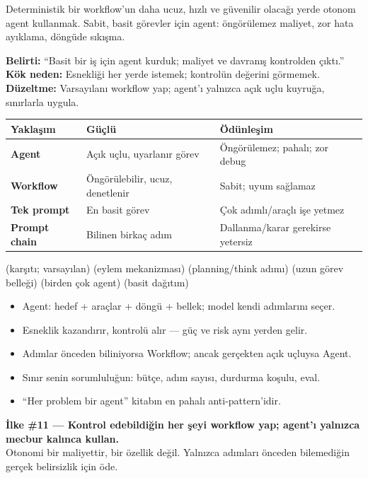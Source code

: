 \begin{antibox}
Deterministik bir workflow'un daha ucuz, hızlı ve güvenilir olacağı yerde otonom
agent kullanmak. Sabit, basit görevler için agent: öngörülemez maliyet, zor hata
ayıklama, döngüde sıkışma.

\smallskip
\textbf{Belirti:} ``Basit bir iş için agent kurduk; maliyet ve davranış kontrolden çıktı.''\\
\textbf{Kök neden:} Esnekliği her yerde istemek; kontrolün değerini görmemek.\\
\textbf{Düzeltme:} Varsayılanı workflow yap; agent'ı yalnızca açık uçlu kuyruğa, sınırlarla uygula.
\end{antibox}

\vspace{2pt}
\begin{tabularx}{\linewidth}{@{}>{\raggedright\arraybackslash}p{26mm} L L@{}}
\toprule
{\sffamily\bfseries\small Yaklaşım} & {\sffamily\bfseries\small Güçlü} & {\sffamily\bfseries\small Ödünleşim} \\
\midrule
\textbf{Agent} & Açık uçlu, uyarlanır görev & Öngörülemez; pahalı; zor debug \\
\addlinespace[2pt]
\textbf{Workflow} & Öngörülebilir, ucuz, denetlenir & Sabit; uyum sağlamaz \\
\addlinespace[2pt]
\textbf{Tek prompt} & En basit görev & Çok adımlı/araçlı işe yetmez \\
\addlinespace[2pt]
\textbf{Prompt chain} & Bilinen birkaç adım & Dallanma/karar gerekirse yetersiz \\
\bottomrule
\end{tabularx}

 (karşıtı; varsayılan) \tlsep {} (eylem mekanizması) \tlsep
{} (planning/think adımı) \tlsep {} (uzun görev belleği) \tlsep
{} (birden çok agent) \tlsep {} (basit dağıtım)

\begin{itemize}
  \item Agent: hedef + araçlar + döngü + bellek; model kendi adımlarını seçer.
  \item Esneklik kazandırır, kontrolü alır --- güç ve risk aynı yerden gelir.
  \item Adımlar önceden biliniyorsa Workflow; ancak gerçekten açık uçluysa Agent.
  \item Sınır senin sorumluluğun: bütçe, adım sayısı, durdurma koşulu, eval.
  \item ``Her problem bir agent'' kitabın en pahalı anti-pattern'idir.
\end{itemize}

\begin{principlebox}
\textbf{İlke \#11 — Kontrol edebildiğin her şeyi workflow yap; agent'ı yalnızca mecbur kalınca kullan.}\\[4pt]
\normalsize Otonomi bir maliyettir, bir özellik değil. Yalnızca adımları önceden
bilemediğin gerçek belirsizlik için öde.
\end{principlebox}
